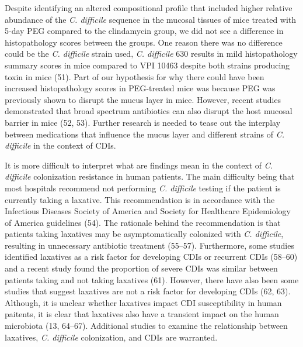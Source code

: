 \documentclass[
  11pt,
]{article}
\begin{document}
Despite identifying an altered compositional profile that included
higher relative abundance of the \emph{C. difficile} sequence in the
mucosal tissues of mice treated with 5-day PEG compared to the
clindamycin group, we did not see a difference in histopathology scores
between the groups. One reason there was no difference could be the
\emph{C. difficile} strain used, \emph{C. difficile} 630 results in mild
histopathology summary scores in mice compared to VPI 10463 despite both
strains producing toxin in mice (51). Part of our hypothesis for why
there could have been increased histopathology scores in PEG-treated
mice was because PEG was previously shown to disrupt the mucus layer in
mice. However, recent studies demonstrated that broad spectrum
antibiotics can also disrupt the host mucosal barrier in mice (52, 53).
Further research is needed to tease out the interplay between
medications that influence the mucus layer and different strains of
\emph{C. difficile} in the context of CDIs.

It is more difficult to interpret what are findings mean in the context
of \emph{C. difficile} colonization resistance in human patients. The
main difficulty being that most hospitals recommend not performing
\emph{C. difficile} testing if the patient is currently taking a
laxative. This recommendation is in accordance with the Infectious
Diseases Society of America and Society for Healthcare Epidemiology of
America guidelines (54). The rationale behind the recommendation is that
patients taking laxatives may be asymptomatically colonized with
\emph{C. difficile}, resulting in unnecessary antibiotic treatment
(55--57). Furthermore, some studies identified laxatives as a risk
factor for developing CDIs or recurrent CDIs (58--60) and a recent study
found the proportion of severe CDIs was similar between patients taking
and not taking laxatives (61). However, there have also been some
studies that suggest laxatives are not a risk factor for developing CDIs
(62, 63). Although, it is unclear whether laxatives impact CDI
susceptibility in human paitents, it is clear that laxatives also have a
transient impact on the human microbiota (13, 64--67). Additional
studies to examine the relationship between laxatives, \emph{C.
difficile} colonization, and CDIs are warranted.
\end{document}
